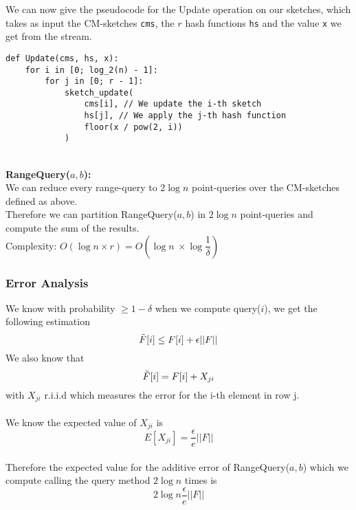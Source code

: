 \documentclass{article}
\begin{document}
We can now give the pseudocode for the Update operation on our sketches, which takes as input
the CM-sketches \verb|cms|, the \(r\) hash functions \verb|hs| and the value \verb|x| we get from the stream.

\begin{lstlisting}
def Update(cms, hs, x):
    for i in [0; log_2(n) - 1]:
        for j in [0; r - 1]:
            sketch_update(
                cms[i], // We update the i-th sketch
                hs[j], // We apply the j-th hash function
                floor(x / pow(2, i))
            )
\end{lstlisting}
\  \\
\textbf{RangeQuery($a,b$):}\\
We can reduce every range-query to $2\log n$ point-queries over the CM-sketches defined as above.\\
Therefore we can partition RangeQuery($a,b$) in $2\log n$ point-queries and compute the sum of the results.\\
Complexity: $O(\log n\times r) = O\left(\log n\ \times \log\dfrac{1}{\delta}\right)$
\subsubsection{Error Analysis}
We know with probability $\geq 1-\delta$ when we compute query($i$),
we get the following estimation
\begin{displaymath}
    \Tilde{F}[i]\leq F[i]+\epsilon ||F||
\end{displaymath}
We also know that
\begin{displaymath}
    \Tilde{F}[i] = F[i]+ X_{ji}
\end{displaymath} with $X_{ji}$ r.i.i.d which measures the error for the i-th element in row j.
\\\\
We know the expected value of $X_{ji}$ is
\begin{displaymath}
    E[X_{ji}] = \displaystyle\frac{\epsilon}{e}||F||
\end{displaymath}
\\
Therefore the expected value for the additive error of RangeQuery($a,b$)
which we compute calling the query method $2\log n$ times is
\begin{displaymath}
    2\log n\frac{\epsilon}{e}||F||
\end{displaymath}
\end{document}
